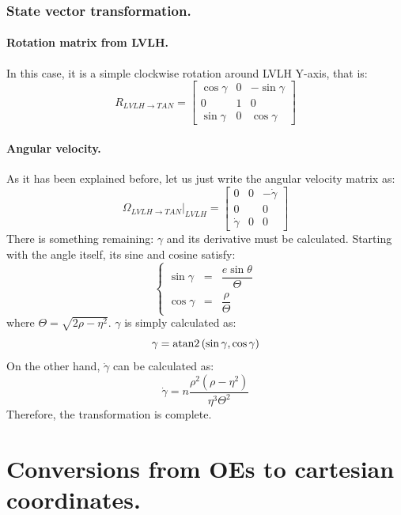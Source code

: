 		\subsubsection{State vector transformation.}
			\paragraph{Rotation matrix from LVLH. \\}
			\indent In this case, it is a simple clockwise rotation around LVLH Y-axis, that is:
			\[
			R_{LVLH\to TAN} = \left[ \begin{array}{lll}
			\cos\gamma 	& 0	& -\sin\gamma\\
			0 			& 1	& 0 \\
			\sin\gamma	& 0 & \cos\gamma
			\end{array}\right]
			\]
			\paragraph{Angular velocity. \\}
			\indent As it has been explained before, let us just write the angular velocity matrix as:
			\[
			\Omega_{LVLH\to TAN}\rvert_{LVLH} = \left[ \begin{array}{lll}
			0 			& 0	& -\dot{\gamma}\\
			0 			&   & 0 \\
			\dot{\gamma}& 0 & 0
			\end{array}\right]
			\] 
			\indent There is something remaining: $\gamma$ and its derivative must be calculated. Starting with the angle itself, its sine and cosine satisfy:
			\[
			\left\{
			\begin{array}{lll}
			\sin\gamma & = & \dfrac{e \sin \theta}{\Theta} \\
			\cos\gamma & = & \dfrac{\rho}{\Theta}
			\end{array}
			\right.
			\]
			\noindent where $\Theta = \sqrt{2 \rho - \eta^2}$. $\gamma$ is simply calculated as:
			\[\gamma = \text{atan2}\left(\sin\gamma , \cos\gamma\right)\]
			\indent On the other hand, $\dot{\gamma}$ can be calculated as:
			\[
			\dot{\gamma} = n \dfrac{\rho^2 \left( \rho - \eta^2\right)}{\eta^3 \Theta^2}
			\]
			\indent Therefore, the transformation is complete.
\section{Conversions from OEs to cartesian coordinates.}
%
%
